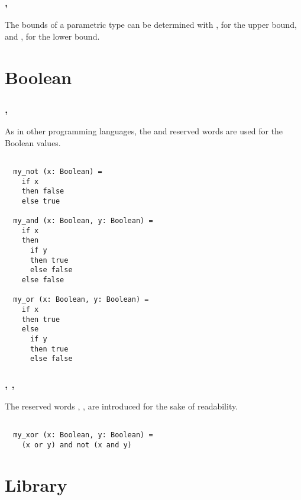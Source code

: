 \subsubsection{\sodasubtype, \sodasupertype}

The bounds of a parametric type can be determined with \sodasubtype, for the upper bound, and \sodasupertype, for the lower bound.


\section{Boolean}

\subsubsection{\sodafalse, \sodatrue}

As in other programming languages, the \sodafalse and \sodatrue reserved words are used for the Boolean values.

\begin{lstlisting}[label={lst:exampleFalseTrue}]

  my_not (x: Boolean) =
    if x
    then false
    else true

  my_and (x: Boolean, y: Boolean) =
    if x
    then
      if y
      then true
      else false
    else false

  my_or (x: Boolean, y: Boolean) =
    if x
    then true
    else
      if y
      then true
      else false
\end{lstlisting}

\subsubsection{\sodanot, \sodaand, \sodaor}

The reserved words \sodanot, \sodaand, \sodaor are introduced for the sake of readability.

\begin{lstlisting}[label={lst:exampleNotAndOr}]

  my_xor (x: Boolean, y: Boolean) =
    (x or y) and not (x and y)

\end{lstlisting}


\section{Library}

\subsubsection{\sodapackage}

